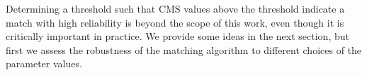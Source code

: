 \documentclass[aoas, preprint]{imsart}\usepackage[]{graphicx}\usepackage[]{color}
\newcommand{\hh}[1]{{\color{magenta} #1}}
\begin{document}
Determining a threshold such that CMS values above the threshold indicate a match with high reliability is beyond the scope of this work, even though it is critically important in practice. We provide some ideas in the next section, but first we assess the robustness of the matching algorithm to different choices of the parameter values. 

\end{document}
